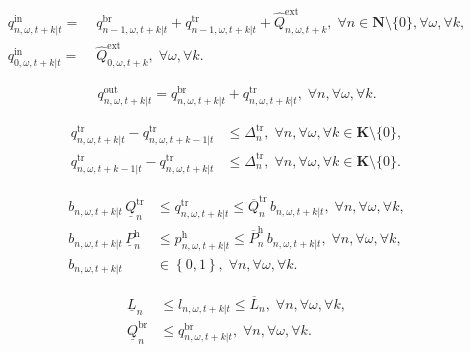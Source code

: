 \documentclass[10pt,a4paper]{amsart}
\begin{document}
\begin{align}
    q^{\mathrm{in}}_{n, \omega, t+k | t} = & \; q^{\mathrm{br}}_{n-1, \omega, t+k | t} + q^{\mathrm{tr}}_{n-1, \omega, t+k | t} + \hat{Q}^\mathrm{ext}_{n, \omega, t+k}, \; \forall n \in \boldsymbol{N} \setminus \{0\}, \forall \omega, \forall k, \label{eq:cen_sto_inflow}\\
    q^{\mathrm{in}}_{0, \omega, t+k | t} = & \; \hat{Q}^\mathrm{ext}_{0, \omega, t+k}, \; \forall \omega, \forall k. \label{eq:cen_sto_inflow_init}
\end{align}

\begin{equation}
\label{eq:cen_sto_outflow}
    q^{\mathrm{out}}_{n, \omega, t+k | t} = q^{\mathrm{br}}_{n, \omega, t+k | t} + q^{\mathrm{tr}}_{n, \omega, t+k | t}, \; \forall n, \forall \omega, \forall k.
\end{equation}

\begin{align}
    q^{\mathrm{tr}}_{n, \omega, t+k|t} - q^{\mathrm{tr}}_{n, \omega, t+k-1|t} & \leq \Delta^{\mathrm{tr}}_{n}, \; \forall n, \forall \omega, \forall k \in \boldsymbol{K} \setminus \{0\}, \label{eq:cen_sto_ramping1}\\
    q^{\mathrm{tr}}_{n, \omega, t+k-1|t} - q^{\mathrm{tr}}_{n, \omega, t+k|t} & \leq \Delta^{\mathrm{tr}}_{n}, \; \forall n, \forall \omega, \forall k \in \boldsymbol{K} \setminus \{0\}. \label{eq:cen_sto_ramping2}
\end{align}

\begin{align}
    b_{n, \omega, t+k|t} \, \underline{Q}^{\mathrm{tr}}_{n} & \leq q^{\mathrm{tr}}_{n, \omega, t+k | t} \leq \overline{Q}^{\mathrm{tr}}_{n} \, b_{n, \omega, t+k|t}, \; \forall n, \forall \omega, \forall k, \label{eq:cen_sto_tr_lim}\\
    b_{n, \omega, t+k|t} \, \underline{P}^{\mathrm{h}}_{n} & \leq p^{\mathrm{h}}_{n, \omega, t+k | t} \leq \overline{P}^{\mathrm{h}}_{n} \, b_{n, \omega, t+k|t}, \; \forall n, \forall \omega, \forall k, \label{eq:cen_sto_ph_lim}\\
    b_{n, \omega, t+k|t} & \in \left\{0,1\right\}, \; \forall n, \forall \omega, \forall k. \label{eq:cen_sto_binary_lim}
\end{align}

\begin{align}
    \underline{L}_{n} & \leq l_{n, \omega, t+k | t} \leq \overline{L}_{n}, \; \forall n, \forall \omega, \forall k, \label{eq:cen_sto_wl_lim}\\
    \underline{Q}^{\mathrm{br}}_{n} & \leq q^{\mathrm{br}}_{n, \omega, t+k | t}, \; \forall n, \forall \omega, \forall k. \label{eq:cen_sto_br_lim}
\end{align}
\end{document}
